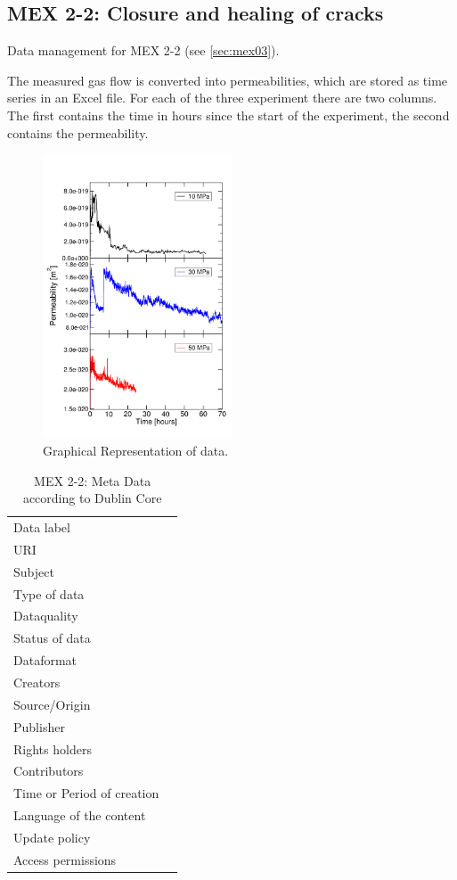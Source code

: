 \subsection{MEX 2-2: Closure and healing of cracks}

Data management for MEX 2-2 (see \ref{sec:mex03}).

The measured gas flow is converted into permeabilities, which are stored as time series in an Excel file. For each of the three experiment there are two columns. The first contains the time in hours since the start of the experiment, the second contains the permeability. 

\begin{figure}[!ht]
\centering
\includegraphics[width=0.5\textwidth]{figures/mex3-perme-time-comparison.png}
\caption{Graphical Representation of data.}
\label{fig:ME3-perme-exp-dmp}
\end{figure}

\begin{table}[h!]
\caption{MEX 2-2: Meta Data according to Dublin Core}
\label{tab:}
\small
\begin{tabular}{R{3cm}|L{7cm}}
\hline
%
Data label &  \\
URI &  \\
Subject  &  \\
Type of data  &  \\
Dataquality  &  \\
Status of data  &  \\
Dataformat  & \\
Creators  &  \\
Source/Origin &  \\
Publisher  &  \\
Rights holders &  \\
Contributors &  \\
Time or Period of creation &  \\
Language of the content &  \\
Update policy &  \\
Access permissions &  \\
%
\hline
\end{tabular}
\end{table}

